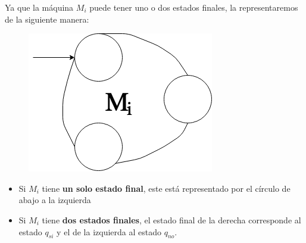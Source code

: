 \begin{frame}
  \PN Ya que la máquina $M_{i}$ puede tener uno o dos estados finales, la representaremos de la siguiente manera:
  \begin{figure}[h]
    \centering
    \includegraphics[scale=0.4]{graphics/figure_5.png}
  \end{figure}
  \begin{itemize}
    \item Si $M_{i}$ tiene \textbf{un solo estado final}, este está representado por el círculo de abajo a la izquierda
    \item Si $M_{i}$ tiene \textbf{dos estados finales}, el estado final de la derecha corresponde al estado $q_{si}$ y
      el de la izquierda al estado $q_{no}$.
  \end{itemize}
\end{frame}

